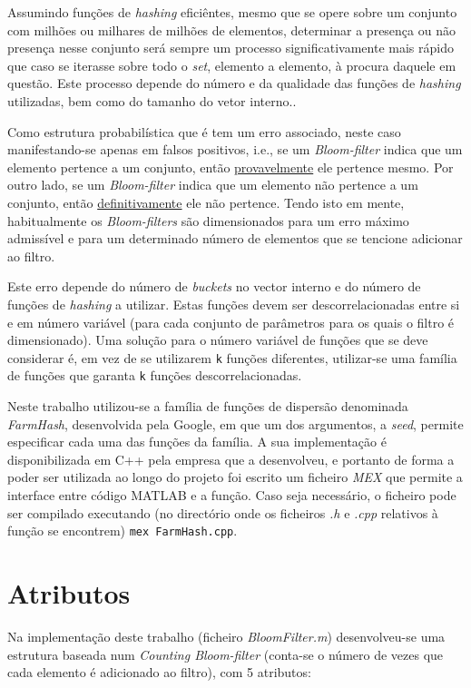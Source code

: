 \documentclass[a4paper,11pt,openright,oneside]{report}
\begin{document}
Assumindo funções de \textit{hashing} eficiêntes, mesmo que se opere sobre um conjunto com milhões ou milhares de milhões de elementos, determinar a presença ou não presença nesse conjunto será sempre um processo significativamente mais rápido que caso se iterasse sobre todo o \textit{set}, elemento a elemento, à procura daquele em questão. Este processo depende do número e da qualidade das funções de \textit{hashing} utilizadas, bem como do tamanho do vetor interno..

Como estrutura probabilística que é tem um erro associado, neste caso manifestando-se apenas em falsos positivos, i.e., se um \textit{Bloom-filter} indica que um elemento pertence a um conjunto, então \underline{provavelmente} ele pertence mesmo. Por outro lado, se um \textit{Bloom-filter} indica que um elemento não pertence a um conjunto, então \underline{definitivamente} ele não pertence. Tendo isto em mente, habitualmente os \textit{Bloom-filters} são dimensionados para um erro máximo admissível e para um determinado número de elementos que se tencione adicionar ao filtro.

Este erro depende do número de \textit{buckets} no vector interno e do número de funções de \textit{hashing} a utilizar. Estas funções devem ser descorrelacionadas entre si e em número variável (para cada conjunto de parâmetros para os quais o filtro é dimensionado). Uma solução para o número variável de funções que se deve considerar é, em vez de se utilizarem \texttt{k} funções diferentes, utilizar-se uma família de funções que garanta \texttt{k} funções descorrelacionadas.

Neste trabalho utilizou-se a família de funções de dispersão denominada \textit{FarmHash}, desenvolvida pela Google, em que um dos argumentos, a \textit{seed}, permite especificar cada uma das funções da família. A sua implementação é disponibilizada em C++ pela empresa que a desenvolveu, e portanto de forma a poder ser utilizada ao longo do projeto foi escrito um ficheiro \textit{MEX} que permite a interface entre código MATLAB e a função. Caso seja necessário, o ficheiro pode ser compilado executando (no directório onde os ficheiros \textit{.h} e \textit{.cpp} relativos à função se encontrem) \verb|mex FarmHash.cpp|.

\section{Atributos}
\label{sec.attributes}

Na implementação deste trabalho (ficheiro \textit{BloomFilter.m}) desenvolveu-se uma estrutura baseada num \textit{Counting Bloom-filter} (conta-se o número de vezes que cada elemento é adicionado ao filtro), com 5 atributos:
\end{document}
